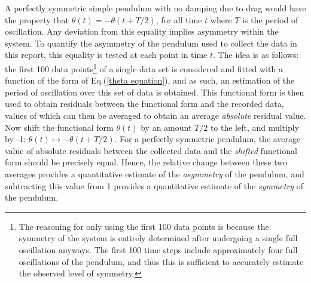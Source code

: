 A perfectly symmetric simple pendulum with no damping due to drag would have the 
property that $\theta(t) = -\theta(t + T/2)$, for all time $t$ where $T$ is the 
period of oscillation. Any deviation from this equality implies asymmetry within 
the system. To quantify the asymmetry of the pendulum used to collect the data 
in this report, this equality is tested at each point in time $t$. The idea is 
as follows: the first 100 data points\footnote{The reasoning for only using the 
first 100 data points is because the symmetry of the system is entirely 
determined after undergoing a single full oscillation anyways. The first 100 
time steps include approximately four full oscillations of the pendulum, and 
thus this is sufficient to accurately estimate the observed level of symmetry.} 
of a single data set is considered and fitted with a function of the form of 
Eq.(\ref{theta equation}), and as such, an estimation of the period of 
oscillation over this set of data is obtained. This functional form is then 
used to obtain residuals between the functional form and the recorded data, 
values of which can then be averaged to obtain an average \textit{absolute} 
residual value. Now shift the functional form $\theta(t)$ by an amount $T/2$ 
to the left, and multiply by -1: $\theta(t) \mapsto -\theta(t + T/2)$. For a 
perfectly symmetric pendulum, the average value of absolute residuals between 
the collected data and the \emph{shifted} functional form should be precisely 
equal. Hence, the relative change between these two averages provides a 
quantitative estimate of the \emph{asymmetry} of the pendulum, and subtracting 
this value from 1 provides a quantitative estimate of the \emph{symmetry} of 
the pendulum. \\[0.20cm]


